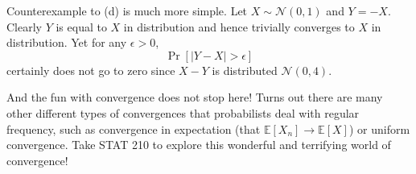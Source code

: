 \documentclass[11pt]{article}
\theoremstyle{definition}
\theoremstyle{remark}
\newcommand{\E}[1]{\mathbb{E}\left[ #1 \right]}
\newcommand{\Norm}{\mathcal{N}}
\begin{document}
Counterexample to (d) is much more simple. Let $X \sim \Norm(0,1)$ and $Y = -X$. Clearly $Y$ is equal to $X$ in distribution and hence trivially converges to $X$ in distribution. Yet for any $\epsilon > 0$, $$\Pr[ |Y - X| > \epsilon ] $$ certainly does not go to zero since $X - Y$ is distributed $\Norm(0,4)$.

And the fun with convergence does not stop here! Turns out there are many other different types of convergences that probabilists deal with regular frequency, such as convergence in expectation (that $\E{X_n} \to \E{X}$) or uniform convergence. Take STAT 210 to explore this wonderful and terrifying world of convergence!
\end{document}
